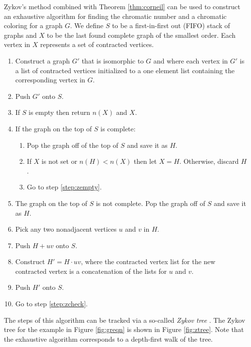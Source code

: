 Zykov's method combined with Theorem \ref{thm:corneil} can be used to construct an exhaustive algorithm for finding
the chromatic number and a chromatic coloring for a graph \(G\).  We define \(S\) to be a first-in-first out (FIFO)
stack of graphs and \(X\) to be the last found complete graph of the smallest order.  Each vertex in \(X\)
represents a set of contracted vertices.
\begin{enumerate}
\item Construct a graph \(G'\) that is isomorphic to \(G\) and where each vertex in \(G'\) is a list of contracted
  vertices initialized to a one element list containing the corresponding vertex in \(G\).
\item Push \(G'\) onto \(S\).
\item \label{step:zempty} If \(S\) is empty then return \(n(X)\) and \(X\).
\item \label{step:zcheck} If the graph on the top of \(S\) is complete:
  \begin{enumerate}
  \item Pop the graph off of the top of \(S\) and save it as \(H\).
  \item If \(X\) is not set or \(n(H)<n(X)\) then let \(X=H\).  Otherwise, discard \(H\).
  \item Go to step \ref{step:zempty}.
  \end{enumerate}
\item The graph on the top of \(S\) is not complete.  Pop the graph off of \(S\) and save it as \(H\).
\item Pick any two nonadjacent vertices \(u\) and \(v\) in \(H\).
\item Push \(H+uv\) onto \(S\).
\item Construct \(H'=H\cdot uv\), where the contracted vertex list for the new contracted vertex is a concatenation
  of the lists for \(u\) and \(v\).
\item Push \(H'\) onto \(S\).
\item Go to step \ref{step:zcheck}.
\end{enumerate}

The steps of this algorithm can be tracked via a so-called \emph{Zykov tree} \cite{corneil}.  The Zykov tree for
the example in Figure \ref{fig:greqn} is shown in Figure \ref{fig:ztree}.  Note that the exhaustive algorithm
corresponds to a depth-first walk of the tree.

